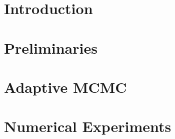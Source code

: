 



\maketitle

\tableofcontents

\chapter{Introduction}


\chapter{Preliminaries}


\chapter{Adaptive MCMC}


\chapter{Numerical Experiments}


\newpage
\printbibliography


